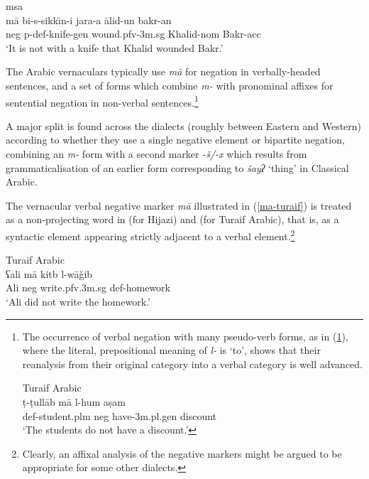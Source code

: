 \documentclass[output=paper,hidelinks]{langscibook}
\begin{document}
\ea\label{knife}  {\sc msa} \citep[173]{Alsharif:PhD}\\
\gll m\={a}  bi-s-sikk\={\i}n-i jara{\hwithstroke}-a {\textchi}\={a}lid-un bakr-an\\
{\sc neg} {\sc p}-{\sc def}-knife-{\sc gen} wound.{\sc pfv-3m.sg} Khalid-{\sc nom} Bakr-{\sc acc}\\
\glt `It is not with a knife that Khalid wounded Bakr.'
\z





\newpage
The Arabic vernaculars typically use {\em m\={a}} for negation in verbally-headed sentences, and a set of forms which combine {\em m-} with pronominal affixes for sentential negation in non-verbal sentences.\footnote{The occurrence of verbal negation with many pseudo-verb forms, as in (\ref{ex:Sem:fn20}), where the literal, prepositional meaning of {\em l-} is `to',  shows that their reanalysis from their original category into a verbal category is well advanced.

\ea \label{ex:Sem:fn20} Turaif Arabic \citep[121]{Alruwaili:PhD}\\
\gll  ṭ-ṭull\={a}b m\={a} l-hum {\textchi}aṣam\\
{\sc def}-student.{\sc plm} {\sc neg} have-{\sc 3m.pl.gen} discount\\
\glt `The students do not have a discount.'
\z
}

A  major split  is found across the dialects  (roughly between Eastern and Western) according to whether they use a single negative element or bipartite negation, combining an {\em m-} form with a second marker {\em -š/-x} which
 results from
grammaticalisation  of an earlier
form corresponding to \emph{{š}ayʔ}  `thing'
 in Classical Arabic.


 The vernacular verbal negative marker {\em m\={a}} illustrated in (\ref{ma-turaif}) is treated as a non-projecting word in \citet{Alsharif:PhD} (for Hijazi)  and \citet{Alruwaili:PhD} (for Turaif Arabic), that is, as a syntactic element appearing strictly adjacent to a verbal element.\footnote{Clearly, an affixal analysis of the negative markers might be argued to be appropriate for some other dialects.}





\ea\label{ma-turaif} Turaif Arabic \citep[162]{Alruwaili:PhD} \\
\gll ʕali m\={a} kit{\textepsilon}b l-w\={a}\v{g}ib\\
Ali {\sc neg} write.{\sc pfv.3m.sg} {\sc def}-homework\\
\glt `Ali did not write the homework.'
\z
\end{document}
